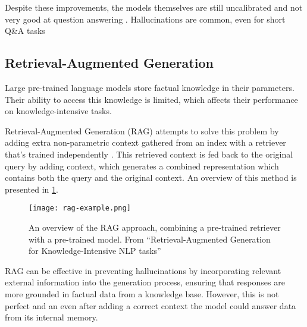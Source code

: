 
Despite these improvements, the models themselves are still uncalibrated and not very good at question answering \citep{how_can_we_know}.
Hallucinations are common, even for short Q\&A tasks

\subsection{Retrieval-Augmented Generation}

Large pre-trained language models store factual knowledge in their parameters.
Their ability to access this knowledge is limited, which affects their performance on knowledge-intensive tasks.

Retrieval-Augmented Generation (RAG) attempts to solve this problem by adding extra non-parametric context gathered from an index with a retriever that's trained independently \citep{rag}.
This retrieved context is fed back to the original query by adding context, which generates a combined representation which contains both the query and the original context.
An overview of this method is presented in \cref{rag_overview}.

\begin{figure}[htp]
	\centering
	\texttt{[image: rag-example.png]}
	\caption{An overview of the RAG approach, combining a pre-trained retriever with a pre-trained model. From ``Retrieval-Augmented Generation for Knowledge-Intensive NLP tasks'' \citep{rag}}
	\label{rag_overview}
\end{figure}

RAG can be effective in preventing hallucinations by incorporating relevant external information into the generation process, ensuring that responses are more grounded in factual data from a knowledge base.
However, this is not perfect and an even after adding a correct context the model could answer data from its internal memory.




